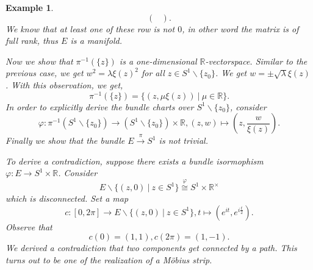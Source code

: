 \documentclass[8pt]{article}
\newtheorem{example}{Example}[section]
\newcommand{\R}[0]{\mathbb{R}}
\newcommand{\sep}[0]{\:|\:}
\begin{document}
\begin{example}
\begin{equation*}
\begin{pmatrix}
    \end{pmatrix}.
  \end{equation*}
  We know that at least one of these row is not $0$, in other word the matrix is of full rank, thus $E$ is a manifold.
  \par Now we show that $\pi^{-1}(\{z\})$ is a one-dimensional $\R$-vectorspace. Similar to the previous case, we get $w^2 = \lambda\xi(z)^2$ for all $z\in S^1\backslash\{z_0\}$. We get $w =\pm\sqrt{\lambda}\xi(z)$. With this observation, we get,
  \begin{equation*}
    \pi^{-1}(\{z\}) = \{(z,\mu\xi(z))\sep\mu\in\R\}.
  \end{equation*}
  In order to explicitly derive the bundle charts over $S^1\backslash\{z_0\}$, consider 
  \begin{equation*}
    \varphi:\pi^{-1}(S^1\backslash\{z_0\})\to(S^1\backslash\{z_0\})\times \R, (z,w)\mapsto \left(z,{\frac w {\xi(z)}}\right).
  \end{equation*}
  Finally we show that the bundle $E\stackrel{\pi}{\to}S^1$ is not trivial.
  \par To derive a contradiction, suppose there exists a bundle isormophism $\varphi:E\to S^1\times \R$. Consider 
  \begin{equation*}
    E\backslash\{(z,0)\sep z\in S^1\}\stackrel{\varphi}{\cong}S^1\times\R^\times
  \end{equation*}
  which is disconnected. Set a map
  \begin{equation*}
    c:[0,2\pi]\to E\backslash\{(z,0)\sep z\in S^1\}, t\mapsto (e^{it},e^{i{\frac t 2}}).
  \end{equation*}
  Observe that 
  \begin{equation*}
    c(0) = (1,1), c(2\pi) = (1,-1).
  \end{equation*}
  We derived a contradiction that two components get connected by a path. This turns out to be one of the realization of a Möbius strip.
\end{example}
\end{document}
